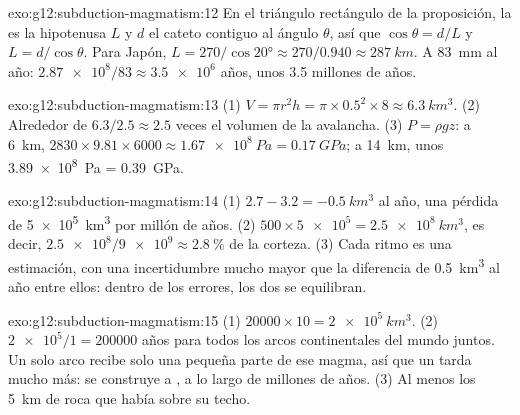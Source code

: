 \begin{solution}{exo:g12:subduction-magmatism:12}
En el triángulo rectángulo de la proposición, la  es la hipotenusa $L$
y $d$ el cateto contiguo al ángulo $\theta$, así que $\cos\theta = d/L$ y $L =
d/\cos\theta$. Para Japón, $L = 270/\cos\ang{20} \approx 270/0.940 \approx
\qty{287}{km}$. A \qty{83}{mm} al año: $\num{2.87e8}/83 \approx \num{3.5e6}$
años, unos 3.5 millones de años.
\end{solution}

\begin{solution}{exo:g12:subduction-magmatism:13}
(1) $V = \pi r^2 h = \pi \times 0.5^2 \times 8 \approx \qty{6.3}{km^3}$.
(2) Alrededor de $6.3/2.5 \approx 2.5$ veces el volumen de la avalancha.
(3) $P = \rho g z$: a \qty{6}{km}, $2830 \times 9.81 \times 6000 \approx
\qty{1.67e8}{Pa} = \qty{0.17}{GPa}$; a \qty{14}{km}, unos
\qty{3.89e8}{Pa} = \qty{0.39}{GPa}.
\end{solution}

\begin{solution}{exo:g12:subduction-magmatism:14}
(1) $2.7 - 3.2 = \qty{-0.5}{km^3}$ al año, una pérdida de \qty{5e5}{km^3}
por millón de años. (2) $500 \times \num{5e5} = \qty{2.5e8}{km^3}$, es decir,
$\num{2.5e8}/\num{9e9} \approx \qty{2.8}{\percent}$ de la corteza. (3) Cada
ritmo es una estimación, con una incertidumbre mucho mayor que la diferencia
de \qty{0.5}{km^3} al año entre ellos: dentro de los errores, los dos se
equilibran.
\end{solution}

\begin{solution}{exo:g12:subduction-magmatism:15}
(1) $\num{20000} \times 10 = \qty{2e5}{km^3}$. (2) $\num{2e5}/1 =
\num{200000}$ años para todos los arcos continentales del mundo juntos. Un
solo arco recibe solo una pequeña parte de ese magma, así que un 
tarda mucho más: se construye  a , a lo largo de millones de años.
(3) Al menos los \qty{5}{km} de roca que había sobre su techo.
\end{solution}

